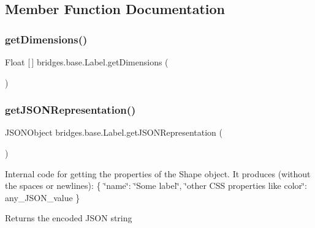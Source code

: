 \subsection{Member Function Documentation}
\mbox{\label{classbridges_1_1base_1_1_label_a9df9f801df020ba601a7bd33f38b4b0f}} 
\subsubsection{\texorpdfstring{getDimensions()}{getDimensions()}}
{\footnotesize\ttfamily Float \mbox{[}$\,$\mbox{]} bridges.\+base.\+Label.\+get\+Dimensions (\begin{DoxyParamCaption}{ }\end{DoxyParamCaption})}

\mbox{\label{classbridges_1_1base_1_1_label_a6befc6655ce36868213be289571c6315}} 
\subsubsection{\texorpdfstring{getJSONRepresentation()}{getJSONRepresentation()}}
{\footnotesize\ttfamily J\+S\+O\+N\+Object bridges.\+base.\+Label.\+get\+J\+S\+O\+N\+Representation (\begin{DoxyParamCaption}{ }\end{DoxyParamCaption})}

Internal code for getting the properties of the Shape object. It produces (without the spaces or newlines)\+: \{ \char`\"{}name\char`\"{}\+: \char`\"{}\+Some label\char`\"{}, \char`\"{}other C\+S\+S properties like color\char`\"{}\+: any\+\_\+\+J\+S\+O\+N\+\_\+value \} \begin{DoxyReturn}{Returns}
the encoded J\+S\+ON string 
\end{DoxyReturn}
\mbox{\label{classbridges_1_1base_1_1_label_ab5f2d60e519db2499f326c4ccb967b25}} 

